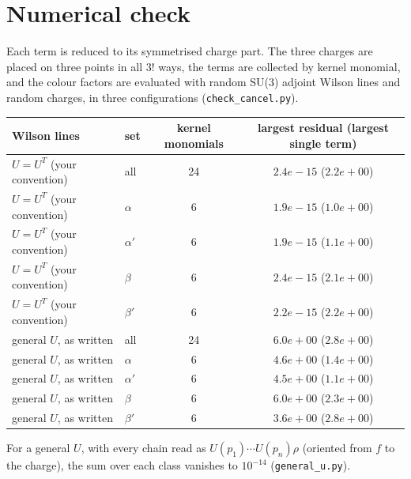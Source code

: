 \documentclass[10pt]{article}
\begin{document}
\section{Numerical check}\label{sec:num}
Each term is reduced to its symmetrised charge part. The three charges are placed on three points in all $3!$ ways, the terms are collected by kernel monomial, and the colour factors are evaluated with random SU(3) adjoint Wilson lines and random charges, in three configurations (\texttt{check\_cancel.py}).
\begin{center}\begin{tabular}{llcc}\toprule
Wilson lines & set & kernel monomials & largest residual (largest single term)\\\midrule
$U=U^T$ (your convention) & all & 24 & $2.4e-15$ ($2.2e+00$)\\
$U=U^T$ (your convention) & $\alpha$ & 6 & $1.9e-15$ ($1.0e+00$)\\
$U=U^T$ (your convention) & $\alpha'$ & 6 & $1.9e-15$ ($1.1e+00$)\\
$U=U^T$ (your convention) & $\beta$ & 6 & $2.4e-15$ ($2.1e+00$)\\
$U=U^T$ (your convention) & $\beta'$ & 6 & $2.2e-15$ ($2.2e+00$)\\
\midrule
general $U$, as written & all & 24 & $6.0e+00$ ($2.8e+00$)\\
general $U$, as written & $\alpha$ & 6 & $4.6e+00$ ($1.4e+00$)\\
general $U$, as written & $\alpha'$ & 6 & $4.5e+00$ ($1.1e+00$)\\
general $U$, as written & $\beta$ & 6 & $6.0e+00$ ($2.3e+00$)\\
general $U$, as written & $\beta'$ & 6 & $3.6e+00$ ($2.8e+00$)\\
\midrule
\bottomrule\end{tabular}\end{center}
For a general $U$, with every chain read as $U(p_1)\cdots U(p_n)\rho$ (oriented from $f$ to the charge), the sum over each class vanishes to $10^{-14}$ (\texttt{general\_u.py}).
\end{document}
